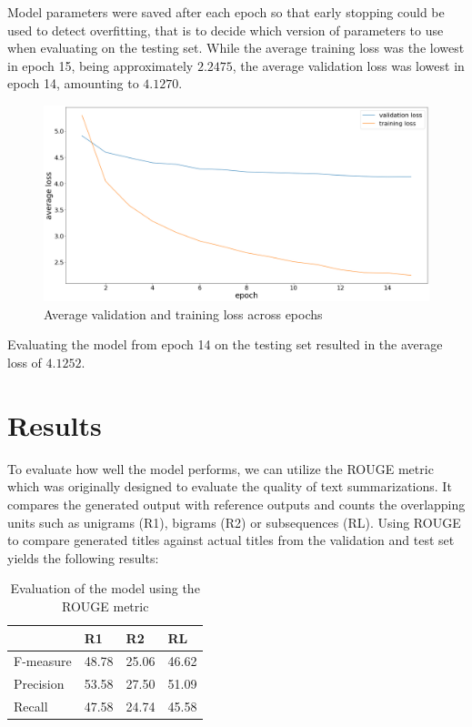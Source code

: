 \documentclass{article}
\begin{document}
Model parameters were saved after each epoch so that early stopping could be used to detect  overfitting, that is to decide which version of parameters to use when evaluating on the testing set. While the average training loss was the lowest in epoch 15, being approximately $2.2475$, the average validation loss was lowest in epoch 14, amounting to $4.1270$. 
\begin{figure}[H]
    \centering
    \includegraphics[scale=0.25]{images/valid_train_loss.png}
    \caption{Average validation and training loss across epochs}
\end{figure}
\noindent Evaluating the model from epoch 14 on the testing set resulted in the average loss of $4.1252$.


\section{Results}

To evaluate how well the model performs, we can utilize the ROUGE metric \citep{rouge} which was originally designed to evaluate the quality of text summarizations. It compares the generated output with reference outputs and counts the overlapping units such as unigrams (R1), bigrams (R2) or subsequences (RL). Using ROUGE to compare generated titles against actual titles from the validation and test set yields the following results:

\begin{table}[H]
    \centering
    \begin{tabular}{l|l|l|l}
        \toprule
        & R1 & R2 & RL \\
        \hline
        \midrule
        F-measure & 48.78 & 25.06 & 46.62\\
        Precision & 53.58 & 27.50 & 51.09\\
        Recall & 47.58 & 24.74 & 45.58\\
        \bottomrule
    \end{tabular}
    \caption{Evaluation of the model using the ROUGE metric}
    \label{fig:word_len_stats}
\end{table}
\end{document}
